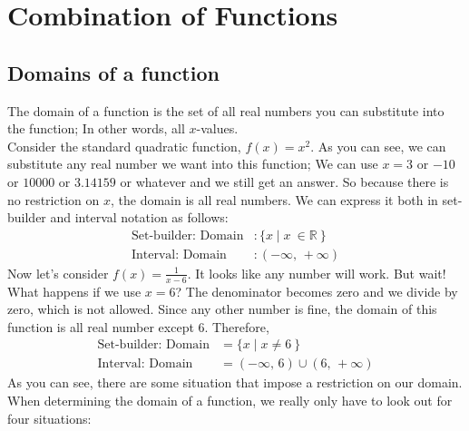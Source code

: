 \chapter{Combination of Functions}
\section{Domains of a function}
The domain of a function is the set of all real numbers you can substitute into the function; In other words, all $x$-values.\\
Consider the standard quadratic function, $f(x) = x^2$. As you can see, we can substitute any real number we want into this function; We can use $x=3$ or $-10$ or $10000$ or $3.14159$ or whatever and we still get an answer. So because there is no restriction on $x$, the domain is all real numbers. We can express it both in set-builder and interval notation as follows:
\begin{align*}
        \text{Set-builder: Domain} &: \{x \mid x\ \in \mathbb{R}\ \}\\
        \text{Interval: Domain} &: (-\infty,\, +\infty)
\end{align*}
Now let's consider $f(x)=\frac{1}{x-6}$. It looks like any number will work. But wait! What happens if we use $x=6$? The denominator becomes zero and we divide by zero, which is not allowed. Since any other number is fine, the domain of this function is all real number except $6$.  Therefore,
\begin{align*}
        \text{Set-builder: Domain} &= \{x \mid x\neq 6\ \}\\
        \text{Interval: Domain} &= (-\infty,\,6) \cup (6,\,+\infty)
\end{align*}
As you can see, there are some situation that impose a restriction on our domain. When determining the domain of a function, we really only have to look out for four situations:
